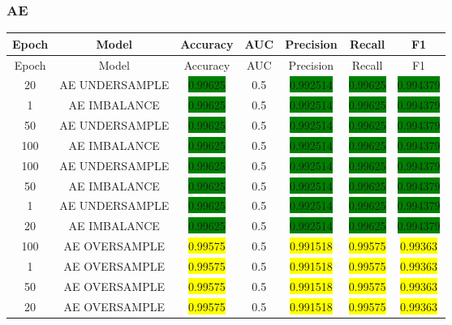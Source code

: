 \subsubsection{AE}
\begin{longtable}{|c|c|c|c|c|c|c|}
	\hline
	Epoch & Model & Accuracy & AUC & Precision & Recall & F1\\ \hline
	\endfirsthead
	\hline
	Epoch & Model & Accuracy & AUC & Precision & Recall & F1\\ \hline
	\endhead
	20 & AE UNDERSAMPLE & \colorbox{green}{0.99625} & 0.5 & \colorbox{green}{0.992514} & \colorbox{green}{0.99625} & \colorbox{green}{0.994379}\\ \hline
	1 & AE IMBALANCE & \colorbox{green}{0.99625} & 0.5 & \colorbox{green}{0.992514} & \colorbox{green}{0.99625} & \colorbox{green}{0.994379}\\ \hline
	50 & AE UNDERSAMPLE & \colorbox{green}{0.99625} & 0.5 & \colorbox{green}{0.992514} & \colorbox{green}{0.99625} & \colorbox{green}{0.994379}\\ \hline
	100 & AE IMBALANCE & \colorbox{green}{0.99625} & 0.5 & \colorbox{green}{0.992514} & \colorbox{green}{0.99625} & \colorbox{green}{0.994379}\\ \hline
	100 & AE UNDERSAMPLE & \colorbox{green}{0.99625} & 0.5 & \colorbox{green}{0.992514} & \colorbox{green}{0.99625} & \colorbox{green}{0.994379}\\ \hline
	50 & AE IMBALANCE & \colorbox{green}{0.99625} & 0.5 & \colorbox{green}{0.992514} & \colorbox{green}{0.99625} & \colorbox{green}{0.994379}\\ \hline
	1 & AE UNDERSAMPLE & \colorbox{green}{0.99625} & 0.5 & \colorbox{green}{0.992514} & \colorbox{green}{0.99625} & \colorbox{green}{0.994379}\\ \hline
	20 & AE IMBALANCE & \colorbox{green}{0.99625} & 0.5 & \colorbox{green}{0.992514} & \colorbox{green}{0.99625} & \colorbox{green}{0.994379}\\ \hline
	100 & AE OVERSAMPLE & \colorbox{yellow}{0.99575} & 0.5 & \colorbox{yellow}{0.991518} & \colorbox{yellow}{0.99575} & \colorbox{yellow}{0.99363}\\ \hline
	1 & AE OVERSAMPLE & \colorbox{yellow}{0.99575} & 0.5 & \colorbox{yellow}{0.991518} & \colorbox{yellow}{0.99575} & \colorbox{yellow}{0.99363}\\ \hline
	50 & AE OVERSAMPLE & \colorbox{yellow}{0.99575} & 0.5 & \colorbox{yellow}{0.991518} & \colorbox{yellow}{0.99575} & \colorbox{yellow}{0.99363}\\ \hline
	20 & AE OVERSAMPLE & \colorbox{yellow}{0.99575} & 0.5 & \colorbox{yellow}{0.991518} & \colorbox{yellow}{0.99575} & \colorbox{yellow}{0.99363}\\ \hline

\end{longtable}
